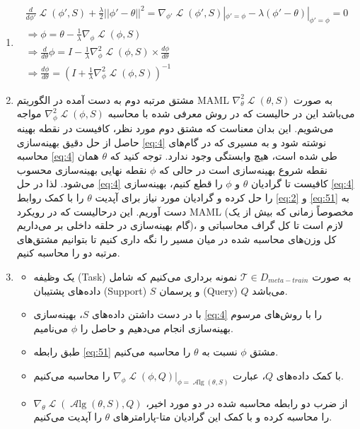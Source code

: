 \documentclass{article}
\DeclareMathOperator{\Loss}{\mathcal{L}}
\DeclareMathOperator{\Alg}{\mathcal{A}lg}
\begin{document}
\begin{enumerate}
\item

\begin{subequations}
	\begin{alignat}{2}
		\frac{d}{d\phi'} \Loss(\phi', S) + \frac{\lambda}{2}||\phi' - \theta||^2 = \nabla_{\phi'} \Loss(\phi', S) |_{\phi' = \phi} - \lambda (\phi'-\theta) |_{\phi' = \phi} = 0 \\ 
		\Rightarrow \phi = \theta - \frac{1}{\lambda} \nabla_\phi \Loss (\phi, S) \\
		\Rightarrow \frac{d}{d\theta} \phi = I - \frac{1}{\lambda} \nabla^2_\phi \Loss (\phi, S) \times \frac{d\phi}{d\theta} \\ 
		\Rightarrow \frac{d\phi}{d\theta} = 
		(I +‌ 
		\frac{1}{\lambda} \nabla^2_\phi \Loss (\phi, S)
		)^{-1} \label{eq:51}
	\end{alignat}
\end{subequations}

\item
مشتق مرتبه دوم به دست آمده در الگوریتم MAML به صورت 
$\nabla^2_\theta \Loss(\theta, S)$
می‌باشد این در حالیست که در روش معرفی شده با محاسبه
$\nabla^2_\phi \Loss(\phi, S)$
مواجه می‌شویم. این بدان معناست که مشتق دوم مورد نظر، کافیست در نقطه بهینه حاصل از حل دقیق بهینه‌سازی
\ref{eq:4}
نوشته شود و به مسیری که در گام‌های محاسبه \ref{eq:4}
طی شده است، هیچ وابستگی وجود ندارد. 
توجه کنید که 
$\theta$
همان نقطه شروع بهینه‌سازی است در حالی که 
$\phi$
نقطه نهایی بهینه‌سازی محسوب می‌شود.
لذا در حل 
\ref{eq:4}
کافیست تا گرادیان 
$\theta$
و
$\phi$
را قطع کنیم، بهینه‌سازی 
\ref{eq:4}
را حل کرده و گرادیان مورد نیاز برای آپدیت 
$\theta$
را با کمک روابط 
\ref{eq:2}
و
\ref{eq:51}
به دست آوریم. این درحالیست که در رویکرد MAML (مخصوصاً‌ زمانی که بیش از یک گام بهینه‌سازی در حلقه داخلی بر می‌داریم)، لازم است تا کل گراف محاسباتی و کل وزن‌های محاسبه شده در میان مسیر را نگه داری کنیم تا بتوانیم مشتق‌های مرتبه دو را محاسبه کنیم. 

\item
\begin{itemize}
\item
یک وظیفه (Task) به صورت 
$\mathcal{T} \in D_{meta-train}$
نمونه برداری می‌کنیم که شامل داده‌های پشتیبان (Support)
$S$
و پرسمان (Query)
$Q$
می‌باشد.
\item
با در دست داشتن داده‌های $S$، بهینه‌سازی \ref{eq:4} 
را با روش‌های مرسوم بهینه‌سازی انجام می‌دهیم و حاصل را $\phi$ می‌نامیم.
\item
طبق رابطه 
\ref{eq:51}
مشتق 
$\phi$
نسبت به 
$\theta$
را محاسبه می‌کنیم.
\item
با کمک داده‌های 
$Q$،
عبارت 
$\nabla_{\phi} \Loss (\phi, Q) |_{\phi = \Alg(\theta, S)} $
را محاسبه می‌کنیم.
\item
از ضرب دو رابطه محاسبه شده در دو مورد اخیر، 
$\nabla_{\theta} \Loss (\Alg(\theta, S), Q)$
را محاسبه کرده و با کمک این گرادیان متا-پارامتر‌های 
$\theta$
را آپدیت می‌کنیم.
\end{itemize}

\end{enumerate}
\end{document}
